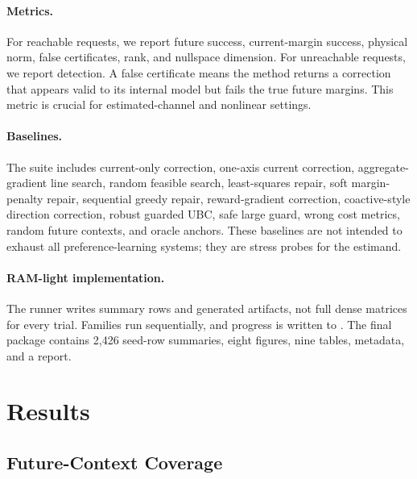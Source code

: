 \documentclass{article}
\begin{document}
\paragraph{Metrics.}
For reachable requests, we report future success, current-margin success,
physical norm, false certificates, rank, and nullspace dimension. For
unreachable requests, we report detection. A false certificate means the method
returns a correction that appears valid to its internal model but fails the true
future margins. This metric is crucial for estimated-channel and nonlinear
settings.

\paragraph{Baselines.}
The suite includes current-only correction, one-axis current correction,
aggregate-gradient line search, random feasible search, least-squares repair,
soft margin-penalty repair, sequential greedy repair, reward-gradient correction,
coactive-style direction correction, robust guarded UBC, safe large guard, wrong
cost metrics, random future contexts, and oracle anchors. These baselines are
not intended to exhaust all preference-learning systems; they are stress
probes for the estimand.

\paragraph{RAM-light implementation.}
The runner writes summary rows and generated artifacts, not full dense matrices
for every trial. Families run sequentially, and progress is written to
. The final package contains 2,426
seed-row summaries, eight figures, nine tables, metadata, and a report.

\begin{table}[t]
\centering
\caption{Runtime and artifact scope of the v3 suite. Seed rows are compact
summary rows, not full dense trial archives.}
\resizebox{\linewidth}{!}{}
\label{tab:runtime}
\end{table}

\section{Results}

\subsection{Future-Context Coverage}
\end{document}
